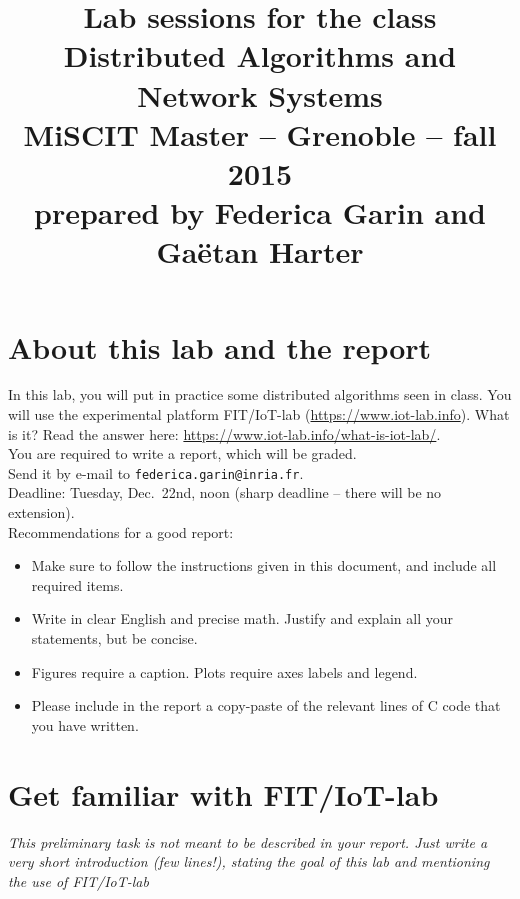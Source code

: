 \documentclass{article}
\begin{document}
\title{
{\normalsize Lab sessions for the class}\\[-1mm]
Distributed Algorithms and Network Systems\\[-2mm]
{\normalsize MiSCIT Master -- Grenoble -- fall 2015}\\[-1mm]
{\normalsize prepared by Federica Garin and Ga\"{e}tan Harter}}
\date{}
\maketitle



\section{About this lab and the report}
In this lab, you will put in practice some distributed algorithms seen in class.
You will use the experimental platform FIT/IoT-lab (\url{https://www.iot-lab.info}).
What is it? Read the answer here: \url{https://www.iot-lab.info/what-is-iot-lab/}.\\

You are required to write a report, which will be graded.\\ Send it by e-mail to \texttt{federica.garin@inria.fr}.\\
Deadline: Tuesday, Dec.~22nd, noon (sharp deadline -- there will be no extension).\\

Recommendations for a good report:
\begin{itemize}
\item Make sure to follow the instructions given in this document, and include all required items.
\item Write in clear English and precise math. Justify and explain all your statements, but be concise.
\item Figures require a caption. Plots require axes labels and legend.
\item Please include in the report a copy-paste of the relevant lines of C code that you have written.
\end{itemize}


\section{Get familiar with FIT/IoT-lab}


\textit{\color{blue} This preliminary task is not meant to be described in your report. Just write a very short introduction (few lines!), stating the goal of this lab and mentioning the use of FIT/IoT-lab}\\
\end{document}
